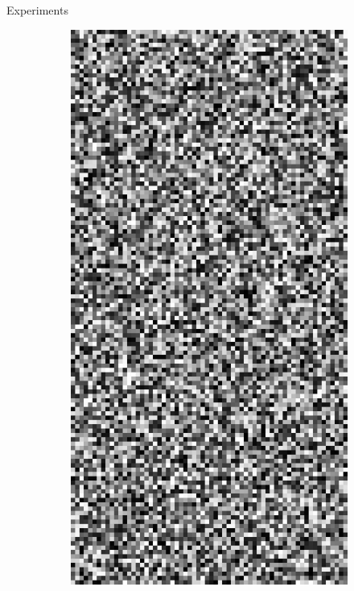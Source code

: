 \documentclass[11pt]{beamer}
\begin{document}

\begin{frame}{Experiments}
\nointerlineskip%


\begin{figure}[t]
\centering
\begin{subfigure}[t]{0.25\textwidth}
\centering
\includegraphics[scale=.8]{exp_input_2.png}

\end{subfigure}
\end{figure}
\end{frame}
\end{document}
